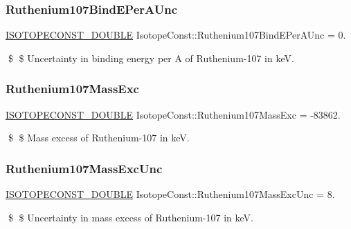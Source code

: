 \subsubsection{\texorpdfstring{Ruthenium107\+Bind\+E\+Per\+A\+Unc}{Ruthenium107BindEPerAUnc}}
{\footnotesize\ttfamily \mbox{\hyperlink{group___isotope_const-_macros_ga8f45a7272ce02c0b4c65c44636ed719a}{I\+S\+O\+T\+O\+P\+E\+C\+O\+N\+S\+T\+\_\+\+D\+O\+U\+B\+LE}} Isotope\+Const\+::\+Ruthenium107\+Bind\+E\+Per\+A\+Unc = 0.}

\$ \$ Uncertainty in binding energy per A of Ruthenium-\/107 in keV. \mbox{\label{group___isotope_const-_ruthenium-_ru107_ga207f9c14042ed7816c559ee4ad7cef60}} 
\subsubsection{\texorpdfstring{Ruthenium107\+Mass\+Exc}{Ruthenium107MassExc}}
{\footnotesize\ttfamily \mbox{\hyperlink{group___isotope_const-_macros_ga8f45a7272ce02c0b4c65c44636ed719a}{I\+S\+O\+T\+O\+P\+E\+C\+O\+N\+S\+T\+\_\+\+D\+O\+U\+B\+LE}} Isotope\+Const\+::\+Ruthenium107\+Mass\+Exc = -\/83862.}

\$ \$ Mass excess of Ruthenium-\/107 in keV. \mbox{\label{group___isotope_const-_ruthenium-_ru107_ga4a12a26d83fb8e852953719a09edd9cf}} 
\subsubsection{\texorpdfstring{Ruthenium107\+Mass\+Exc\+Unc}{Ruthenium107MassExcUnc}}
{\footnotesize\ttfamily \mbox{\hyperlink{group___isotope_const-_macros_ga8f45a7272ce02c0b4c65c44636ed719a}{I\+S\+O\+T\+O\+P\+E\+C\+O\+N\+S\+T\+\_\+\+D\+O\+U\+B\+LE}} Isotope\+Const\+::\+Ruthenium107\+Mass\+Exc\+Unc = 8.}

\$ \$ Uncertainty in mass excess of Ruthenium-\/107 in keV. \mbox{\label{group___isotope_const-_ruthenium-_ru107_ga8e8006a0894d4a55d9ce3837ae5570c3}} 
